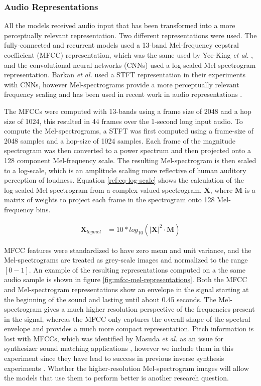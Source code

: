 \subsubsection{Audio Representations}
All the models received audio input that has been transformed into a more perceptually relevant representation. Two different representations were used. The fully-connected and recurrent models used a 13-band Mel-frequency cepstral coefficient (MFCC) representation, which was the same used by Yee-King \textit{et al.} \cite{yee2018automatic}, and the convolutional neural networks (CNNs) used a log-scaled Mel-spectrogram representation. Barkan \textit{et al.} \cite{barkan2019inversynth} used a STFT representation in their experiments with CNNs, however Mel-spectrograms provide a more perceptually relevant frequency scaling and has been used in recent work in audio representations \cite{cramer:learnmore:icassp:19, hershey2017cnn}.

The MFCCs were computed with 13-bands using a frame size of 2048 and a hop size of 1024, this resulted in 44 frames over the 1-second long input audio. To compute the Mel-spectrograms, a STFT was first computed using a frame-size of 2048 samples and a hop-size of 1024 samples. Each frame of the magnitude spectrogram was then converted to a power spectrum and then projected onto a 128 component Mel-frequency scale. The resulting Mel-spectrogram is then scaled to a log-scale, which is an amplitude scaling more reflective of human auditory perception of loudness. Equation \ref{ref:eq-log-scale} shows the calculation of the log-scaled Mel-spectrogram from a complex valued spectrogram, $\textbf{X}$, where $\textbf{M}$ is a matrix of weights to project each frame in the spectrogram onto 128 Mel-frequency bins.

\begin{align}\label{ref:eq-log-scale}
    \textbf{X}_{logmel} &= 10*log_{10}(|\textbf{X}|^2 \cdot \textbf{M})
\end{align}

MFCC features were standardized to have zero mean and unit variance, and the Mel-spectrograms are treated as grey-scale images and normalized to the range $[0-1]$. An example of the resulting representations computed on a the same audio sample is shown in figure \ref{fig:mfcc-mel-representations}. Both the MFCC and Mel-spectrogram representations show an envelope in the signal starting at the beginning of the sound and lasting until about 0.45 seconds. The Mel-spectrogram gives a much higher resolution perspective of the frequencies present in the signal, whereas the MFCC only captures the overall shape of the spectral envelope and provides a much more compact representation. Pitch information is lost with MFCCs, which was identified by Masuda \textit{et al.} as an issue for synthesizer sound matching applications \cite{masudo2021quality}, however we include them in this experiment since they have lead to success in previous inverse synthesis experiments \cite{yee2018automatic}. Whether the higher-resolution Mel-spectrogram images will allow the models that use them to perform better is another research question.

